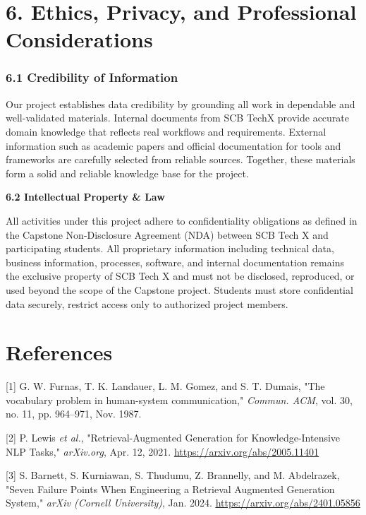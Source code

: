 \documentclass[12pt]{article}
\begin{document}
\section{\texorpdfstring{6. Ethics, Privacy, and Professional
Considerations
}{6. Ethics, Privacy, and Professional Considerations }}\label{ethics-privacy-and-professional-considerations}

\subsubsection{\texorpdfstring{\textbf{6.1 Credibility of
Information}}{6.1 Credibility of Information}}\label{credibility-of-information}

Our project establishes data credibility by grounding all work in
dependable and well-validated materials. Internal documents from SCB
TechX provide accurate domain knowledge that reflects real workflows and
requirements. External information such as academic papers and official
documentation for tools and frameworks are carefully selected from
reliable sources. Together, these materials form a solid and reliable
knowledge base for the project.

\textbf{6.2 Intellectual Property \& Law}

All activities under this project adhere to confidentiality obligations
as defined in the Capstone Non-Disclosure Agreement (NDA) between SCB
Tech X and participating students. All proprietary information including
technical data, business information, processes, software, and internal
documentation remains the exclusive property of SCB Tech X and must not
be disclosed, reproduced, or used beyond the scope of the Capstone
project. Students must store confidential data securely, restrict access
only to authorized project members.

\section{References}\label{references}

{[}1{]} G. W. Furnas, T. K. Landauer, L. M. Gomez, and S. T. Dumais,
"The vocabulary problem in human-system communication," \emph{Commun.
ACM}, vol. 30, no. 11, pp. 964--971, Nov. 1987.

{[}2{]} P. Lewis \emph{et al.}, "Retrieval-Augmented Generation for
Knowledge-Intensive NLP Tasks," \emph{arXiv.org}, Apr. 12, 2021.
\href{https://arxiv.org/abs/2005.11401}{\ul{https://arxiv.org/abs/2005.11401}}

{[}3{]} S. Barnett, S. Kurniawan, S. Thudumu, Z. Brannelly, and M.
Abdelrazek, "Seven Failure Points When Engineering a Retrieval Augmented
Generation System," \emph{arXiv (Cornell University)}, Jan. 2024.
\href{https://arxiv.org/abs/2401.05856}{\ul{https://arxiv.org/abs/2401.05856}}
\end{document}
